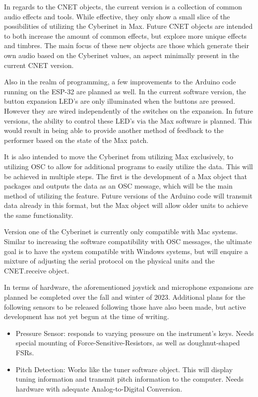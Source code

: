In regards to the CNET objects, the current version is a collection of common audio effects and tools. While effective, they only show a small slice of the possibilities of utilizing the Cyberinet in Max. Future CNET objects are intended to both increase the amount of common effects, but explore more unique effects and timbres. The main focus of these new objects are those which generate their own audio based on the Cyberinet values, an aspect minimally present in the current CNET version.

Also in the realm of programming, a few improvements to the Arduino code running on the ESP-32 are planned as well. In the current software version, the button expansion LED's are only illuminated when the buttons are pressed. However they are wired independently of the switches on the expansion. In future versions, the ability to control these LED's via the Max software is planned. This would result in being able to provide another method of feedback to the performer based on the state of the Max patch.

It is also intended to move the Cyberinet from utilizing Max exclusively, to utilizing OSC to allow for additional programs to easily utilize the data. This will be achieved in multiple steps. The first is the development of a Max object that packages and outputs the data as an OSC message, which will be the main method of utilizing the feature. Future versions of the Arduino code will transmit data already in this format, but the Max object will allow older units to achieve the same functionality.

Version one of the Cyberinet is currently only compatible with Mac systems. Similar to increasing the software compatibility with OSC messages, the ultimate goal is to have the system compatible with Windows systems, but will enquire a mixture of adjusting the serial protocol on the physical units and the CNET.receive object.

In terms of hardware, the aforementioned joystick and microphone expansions are planned be completed over the fall and winter of 2023. Additional plans for the following sensors to be released following those have also been made, but active development has not yet begun at the time of writing.

\begin{itemize}
    \item Pressure Sensor: responds to varying pressure on the instrument's keys. Needs special mounting of Force-Sensitive-Resistors, as well as doughnut-shaped FSRs.
    \item Pitch Detection: Works like the tuner software object. This will display tuning information and transmit pitch information to the computer. Needs hardware with adequate Analog-to-Digital Conversion.
\end{itemize}

